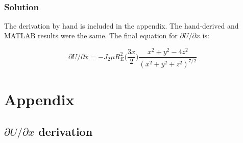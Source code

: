 \documentclass[conf]{new-aiaa}
\begin{document}
\begin{center}
	 \\
\end{center}


\subsubsection*{Solution} 


The derivation by hand is included in the appendix. The hand-derived and MATLAB results were the same. The final equation for $\partial U / \partial x $ is: 

\begin{equation}
	\partial U / \partial x = -J_2 \mu R_E^2 \Big( \dfrac{3x}{2} \Big) \dfrac{ x^2 + y^2 - 4z^2 }{ (x^2 + y^2 + z^2)^{7/2} }
\end{equation}



\newpage
\section*{Appendix} 

\subsection*{ $\partial U / \partial x$ derivation}
\end{document}
